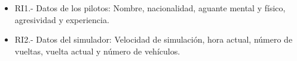 \begin{itemize}
    \item RI1.- Datos de los pilotos: Nombre, nacionalidad, aguante mental y físico, agresividad y experiencia.
    \item RI2.- Datos del simulador: Velocidad de simulación, hora actual, número de vueltas, vuelta actual y número de vehículos.
\end{itemize}